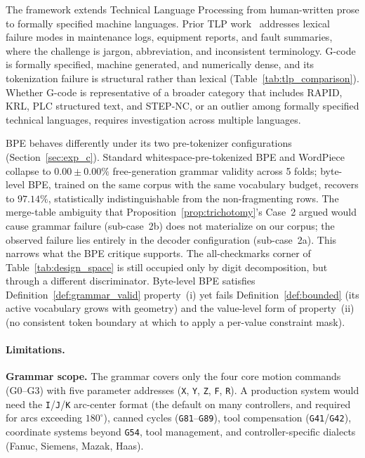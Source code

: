 \documentclass[sensors,article,submit,moreauthors,pdftex]{Definitions/mdpi}
\begin{document}
The framework extends Technical Language Processing from human-written prose to formally specified machine languages. Prior TLP work~\cite{tlp_cleaning,tlp_keyword,tlp_semiautonomous,tlp_nuclear,tlp_fault,tlp_foundational,tlp_adapting} addresses lexical failure modes in maintenance logs, equipment reports, and fault summaries, where the challenge is jargon, abbreviation, and inconsistent terminology. G-code is formally specified, machine generated, and numerically dense, and its tokenization failure is structural rather than lexical (Table~\ref{tab:tlp_comparison}). Whether G-code is representative of a broader category that includes RAPID, KRL, PLC structured text, and STEP-NC, or an outlier among formally specified technical languages, requires investigation across multiple languages.

BPE behaves differently under its two pre-tokenizer configurations (Section~\ref{sec:exp_c}). Standard whitespace-pre-tokenized BPE and WordPiece collapse to $0.00 \pm 0.00\%$ free-generation grammar validity across 5 folds; byte-level BPE, trained on the same corpus with the same vocabulary budget, recovers to $97.14\%$, statistically indistinguishable from the non-fragmenting rows. The merge-table ambiguity that Proposition~\ref{prop:trichotomy}'s Case~2 argued would cause grammar failure (sub-case~2b) does not materialize on our corpus; the observed failure lies entirely in the decoder configuration (sub-case~2a). This narrows what the BPE critique supports. The all-checkmarks corner of Table~\ref{tab:design_space} is still occupied only by digit decomposition, but through a different discriminator. Byte-level BPE satisfies Definition~\ref{def:grammar_valid} property~(i) yet fails Definition~\ref{def:bounded} (its active vocabulary grows with geometry) and the value-level form of property~(ii) (no consistent token boundary at which to apply a per-value constraint mask).

\paragraph{Limitations.}
\textbf{Grammar scope.} The grammar covers only the four core motion commands (G0--G3) with five parameter addresses (\texttt{X}, \texttt{Y}, \texttt{Z}, \texttt{F}, \texttt{R}). A production system would need the \texttt{I}/\texttt{J}/\texttt{K} arc-center format (the default on many controllers, and required for arcs exceeding $180^\circ$), canned cycles (\texttt{G81}--\texttt{G89}), tool compensation (\texttt{G41}/\texttt{G42}), coordinate systems beyond \texttt{G54}, tool management, and controller-specific dialects (Fanuc, Siemens, Mazak, Haas).
\end{document}
